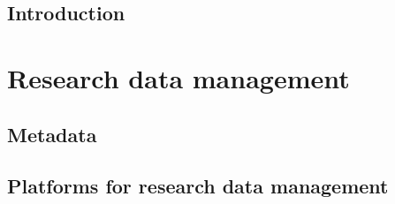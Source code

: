
\glsresetall
\chapter{Introduction} %
\label{cha:introduction}




\part{Research data management} %
\label{prt:research_data_management}

\glsresetall
\chapter{Metadata} %
\label{cha:metadata}









\glsresetall
\chapter{Platforms for research data management} %
\label{cha:platforms_for_research_data_management}









